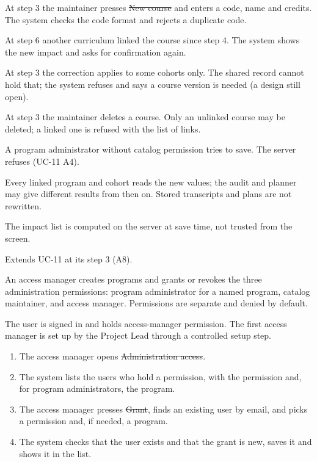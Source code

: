 \begin{altflows}
  \item[A1. Create a course.] At step 3 the maintainer presses \st{New course} and enters a code, name and credits. The
        system checks the code format and rejects a duplicate code.
  \item[A2. Impact changed during review.] At step 6 another curriculum linked the course since step 4. The system shows
        the new impact and asks for confirmation again.
  \item[A3. Value differs by cohort.] At step 3 the correction applies to some cohorts only. The shared record cannot
        hold that; the system refuses and says a course version is needed (a design still open).
  \item[A4. Delete.] At step 3 the maintainer deletes a course. Only an unlinked course may be deleted; a linked one is
        refused with the list of links.
  \item[A5. Program permission only.] A program administrator without catalog permission tries to save. The server
        refuses (UC-11 A4).
\end{altflows}

Every linked program and cohort reads the new values; the audit and planner may give different results from then on.
Stored transcripts and plans are not rewritten.

The impact list is computed on the server at save time, not trusted from the screen.

Extends UC-11 at its step 3 (A8).


An access manager creates programs and grants or revokes the three administration permissions: program administrator for
a named program, catalog maintainer, and access manager. Permissions are separate and denied by default.

The user is signed in and holds access-manager permission. The first access manager is set up by the Project Lead through a
controlled setup step.

\begin{enumerate}
  \item The access manager opens \st{Administration access}.
  \item The system lists the users who hold a permission, with the permission and, for program administrators, the
        program.
  \item The access manager presses \st{Grant}, finds an existing user by email, and picks a permission and, if needed, a
        program.
  \item The system checks that the user exists and that the grant is new, saves it and shows it in the list.
\end{enumerate}

